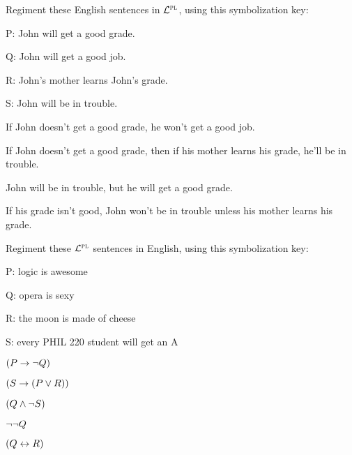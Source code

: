 \problempart
\label{HW2.C}
Regiment these English sentences in $\mathcal{L}^{\textsc{pl}}$, using this symbolization key:
\begin{ekey}
\item[P:] John will get a good grade.
\item[Q:] John will get a good job.
\item[R:] John's mother learns John's grade.
\item[S:] John will be in trouble.
\end{ekey}
	\begin{earg}
		\item If John doesn’t get a good grade, he won’t get a good job.
		\item If John doesn’t get a good grade, then if his mother learns his grade, he’ll be in
trouble.
		\item John will be in trouble, but he will get a good grade.
		\item If his grade isn't good, John won't be in trouble unless his mother learns his grade.
	\end{earg}

	
\problempart
\label{HW2.D}

Regiment these $\mathcal{L}^{\textsc{pl}}$ sentences in English, using this symbolization key:
\begin{ekey}
\item[P:] logic is awesome
\item[Q:] opera is sexy
\item[R:] the moon is made of cheese
\item[S:] every PHIL 220 student will get an A
\end{ekey}
	\begin{earg}
		\item $(P \rightarrow \neg Q)$
		\item $(S \rightarrow (P \vee R))$
		\item $(Q \wedge \neg S)$
		\item $\neg \neg Q$
		\item $(Q \leftrightarrow R)$
	\end{earg}
	
\fi
